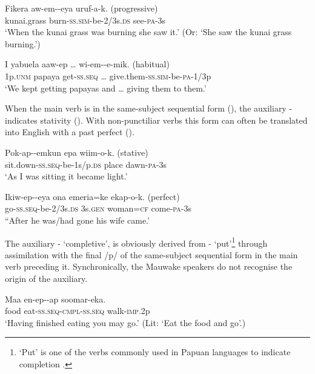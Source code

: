\ea%
\label{ex:x339}
\gll Fikera aw-em--eya uruf-a-k. (progressive) \\
kunai.grass burn-\textsc{ss}.\textsc{sim}-be-2/3s.\textsc{ds} see-\textsc{pa}-3s \\
\glt`When the kunai grass was burning she saw it.' (Or: `She saw the kunai grass burning.')
\z

\ea%
\label{ex:x340}
\gll I yabuela aaw-ep {\dots} wi-em--e-mik. (habitual) \\
1p.\textsc{unm} papaya get-\textsc{ss}.\textsc{seq} {\dots} give.them-\textsc{ss}.\textsc{sim}-be-\textsc{pa}-1/3p \\
\glt`We kept getting papayas and {\dots} giving them to them.'
\z

When the main verb is in the same-subject sequential form (), the auxiliary - indicates stativity (). With non-punctiliar verbs this form can often be translated into English with a past perfect ().

\ea%
\label{ex:x341}
\gll Pok-ap--emkun epa wiim-o-k. (stative) \\
sit.down-\textsc{ss}.\textsc{seq}-be-1s/p.\textsc{ds} place dawn-\textsc{pa}-3s \\
\glt`As I was sitting it became light.'
\z

\ea%
\label{ex:x342}
\gll Ikiw-ep--eya ona emeria=ke ekap-o-k. (perfect) \\
go-\textsc{ss}.\textsc{seq}-be-2/3s.\textsc{ds} 3s.\textsc{gen} woman=\textsc{cf} come-\textsc{pa}-3s \\
\glt``After he was/had gone his wife came.'
\z

The auxiliary - `completive', is obviously derived from - `put'\footnote{`Put' is one of the verbs commonly used in Papuan languages to indicate completion \citep[145]{Foley1986}.} through assimilation with the final /p/ of the same-subject sequential form in the main verb preceding it. Synchronically, the Mauwake speakers do not recognise the origin of the auxiliary.

\ea%
\label{ex:x343}
\gll Maa en-ep--ap soomar-eka. \\
food eat-\textsc{ss}.\textsc{seq}-\textsc{cmpl}-\textsc{ss}.\textsc{seq} walk-\textsc{imp}.2p \\
\glt`Having finished eating you may go.' (Lit: `Eat the food and go'.)
\z

